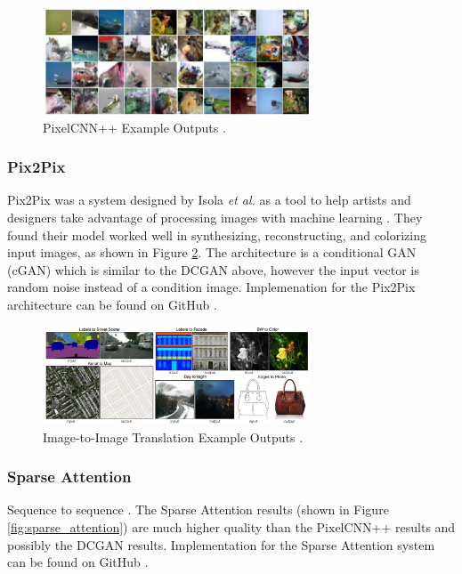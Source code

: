 \documentclass[letterpaper]{article} %
\begin{document}
\begin{figure}[htbp]
\centerline{\includegraphics[width=8cm]{pixelcnn++.png}}
\caption{PixelCNN++ Example Outputs \cite{pixelcnn++}.}
\label{fig:pixelcnn++}
\end{figure}

\subsubsection{Pix2Pix}
Pix2Pix was a system designed by Isola \textit{et al.} 
as a tool to help artists and designers take advantage of processing images with machine learning
\cite{image_to_image}.
They found their model worked well in synthesizing, reconstructing, and colorizing
input images, as shown in Figure \ref{fig:image_to_image}.
The architecture is a conditional GAN (cGAN) which is similar to the DCGAN above, however
the input vector is random noise instead of a condition image.
Implemenation for the Pix2Pix architecture can be found on GitHub
\cite{pix2pix_git}.

\begin{figure}[htbp]
\centerline{\includegraphics[width=8cm]{image_to_image.png}}
\caption{Image-to-Image Translation Example Outputs \cite{image_to_image}.}
\label{fig:image_to_image}
\end{figure}

\subsubsection{Sparse Attention}
Sequence to sequence \cite{generative_transformers}.
The Sparse Attention results (shown in Figure \ref{fig:sparse_attention}) are
much higher quality than the PixelCNN++ results and possibly
the DCGAN results.
Implementation for the Sparse Attention system can be found on GitHub
\cite{sparse_attention_git}.
\end{document}
